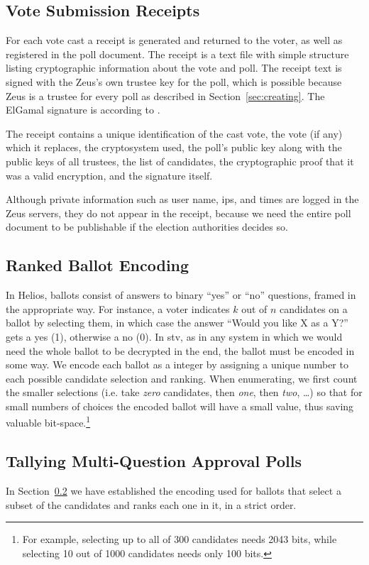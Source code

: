 \documentclass[letterpaper,10pt]{article}
\begin{document}
\subsection{Vote Submission Receipts}
\label{sec:receipts}

For each vote cast a receipt is generated and returned to the voter,
as well as registered in the poll document.
The receipt is a text file with simple structure listing cryptographic
information about the vote and poll.
The receipt text is signed with the Zeus's own trustee key for the
poll, which is possible because Zeus is a trustee for every poll
as described in Section~\ref{sec:creating}.
The ElGamal signature is according to \cite{schneier:1995}.

The receipt contains a unique identification of the cast vote,
the vote (if any) which it replaces, the cryptosystem used,
the poll's public key along with the public keys of all trustees,
the list of candidates, the cryptographic proof that it was a valid
encryption, and the signature itself.

Although private information such as user name, {\sc ip}s, and times
are logged in the Zeus servers, they do not appear in the receipt,
because we need the entire poll document to be publishable if
the election authorities decides so.

\subsection{Ranked Ballot Encoding}
\label{sec:ballot_encoding}
In Helios, ballots consist of answers to binary ``yes'' or ``no''
questions, framed in the appropriate way. For instance, a voter
indicates $k$ out of $n$ candidates on a ballot by selecting them, in
which case the answer ``Would you like X as a Y?'' gets a yes (1),
otherwise a no (0). In {\sc stv}, as in any system in which we would need
the whole ballot to be decrypted in the end, the ballot must be
encoded in some way. We encode each ballot as a integer by assigning a
unique number to each possible candidate selection and ranking. 
When enumerating, we first count the smaller selections (i.e. take
\textit{zero} candidates, then \textit{one}, then \textit{two},
\ldots) so that for small numbers of choices the encoded ballot will
have a small value, thus saving valuable bit-space.\footnote{ For
  example, selecting up to all of 300 candidates needs 2043 bits,
  while selecting 10 out of 1000 candidates needs only 100 bits.}

\subsection{Tallying Multi-Question Approval Polls}
\label{sec:approval_counting}
In Section~\ref{sec:ballot_encoding} we have established the encoding
used for ballots that select a subset of the candidates and ranks each
one in it, in a strict order.
\end{document}
